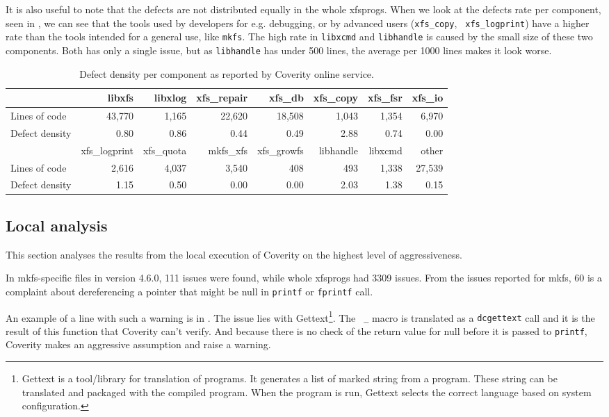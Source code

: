 It is also useful to note that the defects are not distributed equally in the
whole xfsprogs. When we look at the defects rate per component, seen in
, we can see that the tools used by
developers for e.g. debugging, or by advanced users ({\tt xfs\_copy}, {\tt
xfs\_logprint}) have a higher rate than the tools intended for a general use,
like {\tt mkfs}. The high rate in {\tt libxcmd} and {\tt libhandle} is caused
by the small size of these two components. Both has only a single issue, but as
{\tt libhandle} has under 500 lines, the average per 1000 lines makes it look
worse.


\begin{table}[h]
\begin{tabular}{|l||r|r|r|r|r|r|r|}
\hline
 & libxfs & libxlog & xfs\_repair & xfs\_db & xfs\_copy & xfs\_fsr & xfs\_io  \\
\hline
Lines of code & 43,770 & 1,165 & 22,620 & 18,508 & 1,043 & 1,354 & 6,970  \\
\hline
Defect density & 0.80 & 0.86 & 0.44 & 0.49 & 2.88 & 0.74 & 0.00 \\
\hline
\hline
 & xfs\_logprint & xfs\_quota & mkfs\_xfs & xfs\_growfs & libhandle & libxcmd & other \\
\hline
Lines of code & 2,616 & 4,037 & 3,540 & 408 & 493 & 1,338 & 27,539 \\
\hline
Defect density & 1.15 & 0.50 & 0.00 & 0.00 & 2.03 & 1.38 & 0.15 \\
\hline
\end{tabular}
\caption{Defect density per component as reported by Coverity online service.}
\label{tab:results:coverity:components}
\end{table}

\subsection{Local analysis}\label{chap:results:coverity:local}

This section analyses the results from the local execution of Coverity on the
highest level of aggressiveness.

In mkfs-specific files in version 4.6.0, 111 issues were found, while whole xfsprogs
had 3309 issues. From the issues reported for mkfs, 60 is a complaint about
dereferencing a pointer that might be null in {\tt printf} or {\tt fprintf}
call.

An example of a line with such a warning is in
. The issue lies with
Gettext\footnote{Gettext is a tool/library for translation of programs. It
generates a list of marked string from a program. These string can be
translated and packaged with the compiled program. When the program is run,
Gettext selects the correct language based on system configuration.}. The {\tt
\_}
macro is translated as a {\tt dcgettext} call and it is the result of this
function that Coverity can't verify. And because there is no check of the
return value for null before it is passed to {\tt printf}, Coverity makes an
aggressive assumption and raise a warning.

